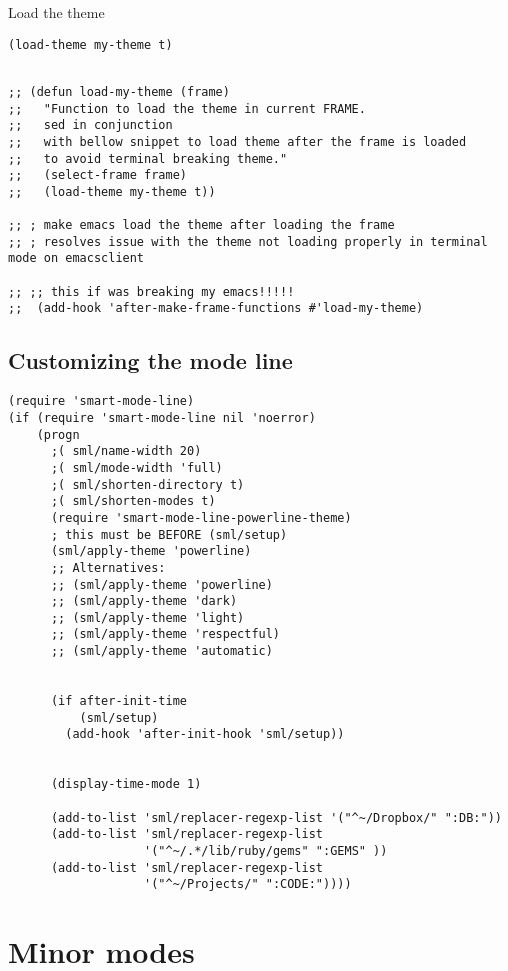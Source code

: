 \documentclass[11pt]{article}
\begin{document}
Load the theme

\begin{verbatim}
(load-theme my-theme t)
\end{verbatim}


\begin{verbatim}

;; (defun load-my-theme (frame)
;;   "Function to load the theme in current FRAME.
;;   sed in conjunction
;;   with bellow snippet to load theme after the frame is loaded
;;   to avoid terminal breaking theme."
;;   (select-frame frame)
;;   (load-theme my-theme t))

;; ; make emacs load the theme after loading the frame
;; ; resolves issue with the theme not loading properly in terminal mode on emacsclient

;; ;; this if was breaking my emacs!!!!!
;;  (add-hook 'after-make-frame-functions #'load-my-theme)
\end{verbatim}



\subsection*{Customizing the mode line}
\label{sec:orga0af57a}

\begin{verbatim}
(require 'smart-mode-line)
(if (require 'smart-mode-line nil 'noerror)
    (progn
      ;( sml/name-width 20)
      ;( sml/mode-width 'full)
      ;( sml/shorten-directory t)
      ;( sml/shorten-modes t)
      (require 'smart-mode-line-powerline-theme)
      ; this must be BEFORE (sml/setup)
      (sml/apply-theme 'powerline)
      ;; Alternatives:
      ;; (sml/apply-theme 'powerline)
      ;; (sml/apply-theme 'dark)
      ;; (sml/apply-theme 'light)
      ;; (sml/apply-theme 'respectful)
      ;; (sml/apply-theme 'automatic)


      (if after-init-time
          (sml/setup)
        (add-hook 'after-init-hook 'sml/setup))


      (display-time-mode 1)

      (add-to-list 'sml/replacer-regexp-list '("^~/Dropbox/" ":DB:"))
      (add-to-list 'sml/replacer-regexp-list
                   '("^~/.*/lib/ruby/gems" ":GEMS" ))
      (add-to-list 'sml/replacer-regexp-list
                   '("^~/Projects/" ":CODE:"))))
\end{verbatim}


\section*{Minor modes}
\label{sec:org015766b}
\end{document}
